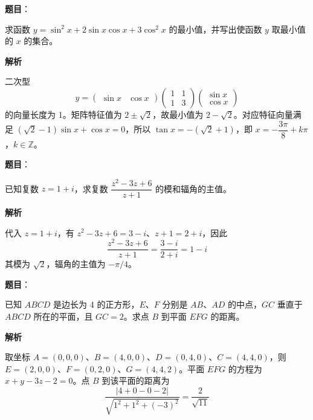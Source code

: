 \begin{answer}

\textbf{题目}：

求函数 $y=\sin^2x+2\sin x\cos x+3\cos^2x$ 的最小值，并写出使函数 $y$ 取最小值的 $x$ 的集合。

\textbf{解析}

二次型
\nopagebreak[4]
\[
y=\begin{pmatrix}\sin x&\cos x\end{pmatrix}
\begin{pmatrix}1&1\\1&3\end{pmatrix}
\begin{pmatrix}\sin x\\\cos x\end{pmatrix}
\]
的向量长度为 1。矩阵特征值为 $2\pm\sqrt2$，故最小值为 $2-\sqrt2$。对应特征向量满足 $(\sqrt2-1)\sin x+\cos x=0$，所以 $\tan x=-(\sqrt2+1)$，即 $x=-\dfrac{3\pi}8+k\pi$，$k\in\mathbb Z$。


\end{answer}
\begin{answer}

\textbf{题目}：

已知复数 $z=1+i$，求复数 $\dfrac{z^2-3z+6}{z+1}$ 的模和辐角的主值。

\textbf{解析}

代入 $z=1+i$，有 $z^2-3z+6=3-i$、$z+1=2+i$，因此
\nopagebreak[4]
\[
\frac{z^2-3z+6}{z+1}
=\frac{3-i}{2+i}=1-i
\]
其模为 $\sqrt2$，辐角的主值为 $-\pi/4$。


\end{answer}
\begin{answer}

\textbf{题目}：

已知 $ABCD$ 是边长为 4 的正方形，$E$、$F$ 分别是 $AB$、$AD$ 的中点，$GC$ 垂直于 $ABCD$ 所在的平面，且 $GC=2$。求点 $B$ 到平面 $EFG$ 的距离。

\textbf{解析}

取坐标 $A=(0,0,0)$、$B=(4,0,0)$、$D=(0,4,0)$、$C=(4,4,0)$，则 $E=(2,0,0)$、$F=(0,2,0)$、$G=(4,4,2)$。平面 $EFG$ 的方程为 $x+y-3z-2=0$。点 $B$ 到该平面的距离为
\nopagebreak[4]
\[
\frac{|4+0-0-2|}{\sqrt{1^2+1^2+(-3)^2}}=\frac2{\sqrt{11}}
\]


\end{answer}
